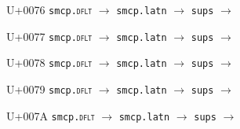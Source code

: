 \documentclass{article}
\begin{document}
\begin{substitutions}
\goodbreak

U+0076  \linebreak
    \texttt{smcp.\textsc{dflt}} $\to$  \linebreak
    \texttt{smcp.latn} $\to$  \linebreak
    \texttt{sups} $\to$  

\goodbreak

U+0077  \linebreak
    \texttt{smcp.\textsc{dflt}} $\to$  \linebreak
    \texttt{smcp.latn} $\to$  \linebreak
    \texttt{sups} $\to$  

\goodbreak

U+0078  \linebreak
    \texttt{smcp.\textsc{dflt}} $\to$  \linebreak
    \texttt{smcp.latn} $\to$  \linebreak
    \texttt{sups} $\to$  

\goodbreak

U+0079  \linebreak
    \texttt{smcp.\textsc{dflt}} $\to$  \linebreak
    \texttt{smcp.latn} $\to$  \linebreak
    \texttt{sups} $\to$  

\goodbreak

U+007A  \linebreak
    \texttt{smcp.\textsc{dflt}} $\to$  \linebreak
    \texttt{smcp.latn} $\to$  \linebreak
    \texttt{sups} $\to$  

\goodbreak

\end{substitutions}

\clearpage
\end{document}
